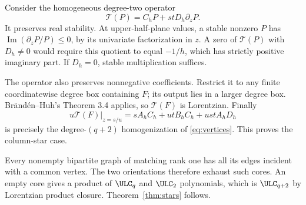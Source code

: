 Consider the homogeneous degree-two operator
\[
 \mathcal T(P)=C_hP+stD_h\partial_zP.
\]
It preserves real stability. At upper-half-plane values, a stable nonzero $P$ has $\operatorname{Im}(\partial_zP/P)\le0$, by its univariate factorization in $z$. A zero of $\mathcal T(P)$ with $D_h\ne0$ would require this quotient to equal $-1/h$, which has strictly positive imaginary part. If $D_h=0$, stable multiplication suffices.

The operator also preserves nonnegative coefficients. Restrict it to any finite coordinatewise degree box containing $F$; its output lies in a larger degree box. Br\"and\'en--Huh's Theorem 3.4 applies, so $\mathcal T(F)$ is Lorentzian. Finally
\[
 u\mathcal T(F)|_{z=s/u}=sA_hC_h+utB_hC_h+ustA_hD_h
\]
is precisely the degree-$(q+2)$ homogenization of \eqref{eq:vertices}. This proves the column-star case.

Every nonempty bipartite graph of matching rank one has all its edges incident with a common vertex. The two orientations therefore exhaust such cores. An empty core gives a product of $\ULC_q$ and $\ULC_2$ polynomials, which is $\ULC_{q+2}$ by Lorentzian product closure. Theorem~\ref{thm:stars} follows.
